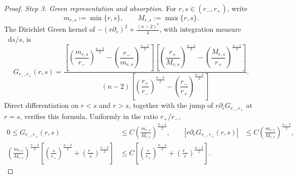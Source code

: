 \documentclass[11pt]{article}
\numberwithin{equation}{section}
\theoremstyle{remark}
\newcommand{\pa}{\partial}
\newcommand{\dd}{\mathop{}\!\mathrm{d}}
\begin{document}
\begin{proof}
\emph{Step 3. Green representation and absorption.}
For \(r,s\in(r_-,r_+)\), write
\[
 m_{r,s}:=\min\{r,s\},
 \qquad
 M_{r,s}:=\max\{r,s\}.
\]
The Dirichlet Green kernel of
\(-(r\pa_r)^2+\frac{(n-2)^2}{4}\), with integration measure \(\dd s/s\), is
\[
 G_{r_-,r_+}(r,s)
 =
 \frac{
 \left[
 \left(\dfrac{m_{r,s}}{r_-}\right)^{\frac{n-2}{2}}
 -\left(\dfrac{r_-}{m_{r,s}}\right)^{\frac{n-2}{2}}
 \right]
 \left[
 \left(\dfrac{r_+}{M_{r,s}}\right)^{\frac{n-2}{2}}
 -\left(\dfrac{M_{r,s}}{r_+}\right)^{\frac{n-2}{2}}
 \right]
 }{
 (n-2)\left[
 \left(\dfrac{r_+}{r_-}\right)^{\frac{n-2}{2}}
 -\left(\dfrac{r_-}{r_+}\right)^{\frac{n-2}{2}}
 \right]
 }.
\]
Direct differentiation on \(r<s\) and \(r>s\), together with the jump of
\(r\pa_rG_{r_-,r_+}\) at \(r=s\), verifies this formula.  Uniformly in the
ratio \(r_+/r_-\),
\begin{equation}\label{eq:multiplicative-green-bounds}
 \begin{aligned}
 0\le G_{r_-,r_+}(r,s)
 &\le C\left(\frac{m_{r,s}}{M_{r,s}}\right)^{\frac{n-2}{2}},\qquad 
 \left|r\pa_rG_{r_-,r_+}(r,s)\right|
 &\le C\left(\frac{m_{r,s}}{M_{r,s}}\right)^{\frac{n-2}{2}},\\
 \left(\frac{m_{r,s}}{M_{r,s}}\right)^{\frac{n-2}{2}}
 \left[
 \left(\frac s{r_+}\right)^{\frac{n-2}{2}}
 +\left(\frac{r_-}{s}\right)^{\frac{n-2}{2}}
 \right]
 &\le C\left[
 \left(\frac r{r_+}\right)^{\frac{n-2}{2}}
 +\left(\frac{r_-}{r}\right)^{\frac{n-2}{2}}
 \right].
 \end{aligned}
\end{equation}


\end{proof}
\end{document}
